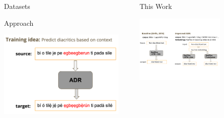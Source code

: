 \documentclass[final]{beamer}
\newlength{\sepwid}
\newlength{\onecolwid}
\newlength{\twocolwid}
\begin{document}
\begin{frame}[t]
\begin{columns}[t]
\begin{column}{\onecolwid}
\begin{block}{Datasets}
\begin{center}
  \end{center}
\end{block}


\vspace{15mm}

\begin{block}{Approach}

\begin{center}
  \includegraphics[trim = 0mm 0mm 0mm 0mm, clip, width=1.0\textwidth]{figures/training.pdf}
\end{center}

\end{block}

\end{column} %



\begin{column}{\sepwid}\end{column} %
\begin{column}{\twocolwid} %

\begin{block}{This Work}

\begin{center}
  \includegraphics[trim = 0mm 50mm 0mm 45mm, clip, width=0.7\textwidth]{figures/improving.pdf}


\end{center}
\end{block}
\end{column}
\end{columns}
\end{frame}
\end{document}
